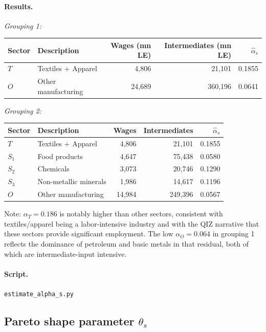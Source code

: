 \documentclass[12pt]{article}
\begin{document}
\paragraph{Results.}

\medskip
\noindent\textit{Grouping 1:}
\begin{center}
\begin{tabular}{llrrr}
\toprule
Sector & Description & Wages (mn LE) & Intermediates (mn LE) & $\hat\alpha_s$ \\
\midrule
$T$ & Textiles + Apparel  & 4,806  & 21,101  & 0.1855 \\
$O$ & Other manufacturing & 24,689 & 360,196 & 0.0641 \\
\bottomrule
\end{tabular}
\end{center}

\noindent\textit{Grouping 2:}
\begin{center}
\begin{tabular}{llrrr}
\toprule
Sector & Description & Wages & Intermediates & $\hat\alpha_s$ \\
\midrule
$T$   & Textiles + Apparel    & 4,806  & 21,101  & 0.1855 \\
$S_1$ & Food products         & 4,647  & 75,438  & 0.0580 \\
$S_2$ & Chemicals             & 3,073  & 20,746  & 0.1290 \\
$S_3$ & Non-metallic minerals & 1,986  & 14,617  & 0.1196 \\
$O$   & Other manufacturing   & 14,984 & 249,396 & 0.0567 \\
\bottomrule
\end{tabular}
\end{center}

\noindent Note: $\alpha_T = 0.186$ is notably higher than other sectors,
consistent with textiles/apparel being a labor-intensive industry and with
the QIZ narrative that these sectors provide significant employment.
The low $\alpha_O = 0.064$ in grouping 1 reflects the dominance of
petroleum and basic metals in that residual, both of which are
intermediate-input intensive.

\paragraph{Script.} \texttt{estimate\_alpha\_s.py}

\subsection{Pareto shape parameter $\theta_s$}
\end{document}
